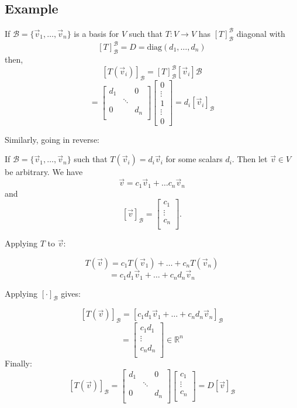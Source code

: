 \documentclass[a4paper,10pt]{article}
\theoremstyle{definition}
\begin{document}
\subsection{Example}
If $\mathcal{B} = \{ \vec{v}_1, \ldots, \vec{v}_n \}$ is a basis for $V$ such 
that $T: V \to V$ has $[T]_\mathcal{B}^\mathcal{B}$ diagonal with
$$[T]_\mathcal{B}^\mathcal{B} = D = \text{diag}(d_1, \ldots, d_n)$$
then,
$$[T(\vec{v}_i)]_\mathcal{B} = [T]_\mathcal{B}^\mathcal{B} [\vec{v}_i]\mathcal{B}$$
$$=
\begin{bmatrix} 
d_1	&	& 0\\
	&	\ddots & \\
0	&	&	d_n\\
\end{bmatrix} 
\begin{bmatrix} 
0 \\
\vdots \\
1\\
\vdots\\
0
\end{bmatrix} 
=
d_i[\vec{v}_i]_\mathcal{B}
$$

Similarly, going in reverse:

If $\mathcal{B} = 	\{ \vec{v}_1, \ldots, \vec{v}_n \}$ such that $T(\vec{v}_i)=
d_i\vec{v}_i$ for some scalars $d_i$. Then let $\vec{v} \in V$ be arbitrary. We
have
$$\vec{v} = c_1 \vec{v}_1 + \ldots c_n \vec{v}_n$$
and
$$[\vec{v}]_\mathcal{B} = 
\begin{bmatrix}
	c_1 \\
	\vdots \\
	c_n \\
\end{bmatrix}
.$$

Applying $T$ to $\vec{v}$:

$$T(\vec{v}) = c_1T(\vec{v}_1) + \ldots + c_nT(\vec{v}_n)$$
$$= c_1d_1\vec{v}_1 + \ldots + c_n d_n \vec{v}_n$$

Applying $[\cdot]_\mathcal{B}$ gives:

$$[T(\vec{v})]_\mathcal{B} = [c_1d_1\vec{v}_1 + \ldots + c_n d_n
\vec{v}_n]_\mathcal{B}$$
$$=
\begin{bmatrix}
	c_1d_1 \\
	\vdots \\
	c_nd_n \\
\end{bmatrix}
\in \mathbb{R}^n
$$
Finally:
$$[T(\vec{v})]_\mathcal{B} =
\begin{bmatrix}
	d_1 &  & 0 \\
	 & \ddots &  \\
	0 &  & d_n \\
\end{bmatrix}
\begin{bmatrix}
	c_1 \\
	\vdots \\
	c_n \\
\end{bmatrix}
=
D[\vec{v}]_\mathcal{B}
$$
\end{document}
